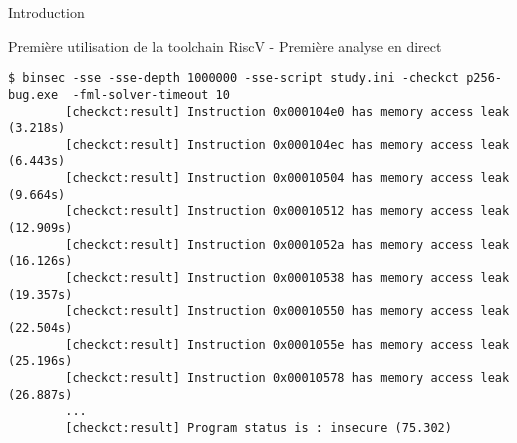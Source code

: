 \documentclass[A4,svgnames,9pt,aspectratio=169]{beamer}
\begin{document}
\begin{frame}[fragile]{Introduction}

  Première utilisation de la toolchain RiscV - Première analyse en direct

  \begin{lstlisting}[style=global, caption={Exécution de la dernière fois}, gobble=8]
        $ binsec -sse -sse-depth 1000000 -sse-script study.ini -checkct p256-bug.exe  -fml-solver-timeout 10
        [checkct:result] Instruction 0x000104e0 has memory access leak (3.218s)
        [checkct:result] Instruction 0x000104ec has memory access leak (6.443s)
        [checkct:result] Instruction 0x00010504 has memory access leak (9.664s)
        [checkct:result] Instruction 0x00010512 has memory access leak (12.909s)
        [checkct:result] Instruction 0x0001052a has memory access leak (16.126s)
        [checkct:result] Instruction 0x00010538 has memory access leak (19.357s)
        [checkct:result] Instruction 0x00010550 has memory access leak (22.504s)
        [checkct:result] Instruction 0x0001055e has memory access leak (25.196s)
        [checkct:result] Instruction 0x00010578 has memory access leak (26.887s)
        ...
        [checkct:result] Program status is : insecure (75.302)
  \end{lstlisting}
  
\end{frame}

\end{document}
